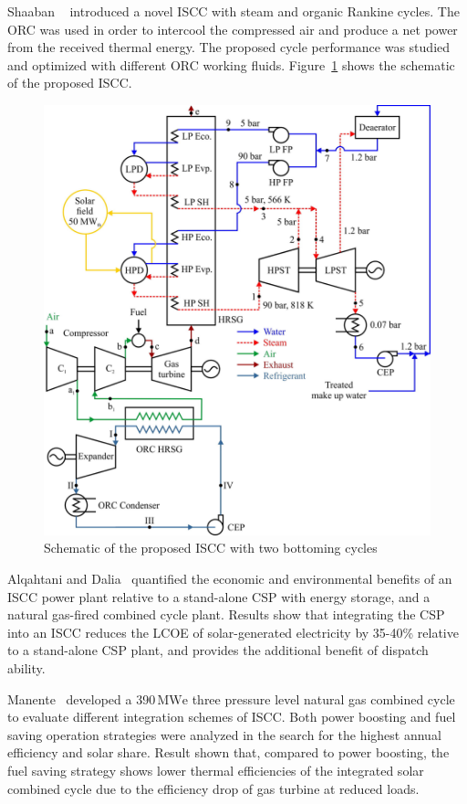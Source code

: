 Shaaban ~\cite{Shaaban2016} introduced a novel ISCC with steam and organic Rankine cycles. The ORC was used in order to intercool the compressed air and produce a net power from the received thermal energy. The proposed cycle performance was studied and optimized with different ORC working fluids. Figure~\ref{fig:Shaaban2016} shows the schematic of the proposed ISCC.
\begin{figure}[!ht]
\centering
\includegraphics[width=.8\textwidth]{fig/Shaaban2016.jpg}
\caption{Schematic of the proposed ISCC with two bottoming cycles}\label{fig:Shaaban2016}
\end{figure}

Alqahtani and Dalia~\cite{Alqahtani2016} quantified the economic and environmental benefits of an ISCC power plant relative to a stand-alone CSP with energy storage, and a natural gas-fired combined cycle plant. Results show that integrating the CSP into an ISCC reduces the LCOE of solar-generated electricity by 35-40\% relative to a stand-alone CSP plant, and provides the additional benefit of dispatch ability.

Manente~\cite{Manente2016} developed a 390$\,\mathrm{MWe}$ three pressure level natural gas combined cycle to evaluate different integration schemes of ISCC. Both power boosting and fuel saving operation strategies were analyzed in the search for the highest annual efficiency and solar share. Result shown that, compared to power boosting, the fuel saving strategy shows lower thermal efficiencies of the integrated solar combined cycle due to the efficiency drop of gas turbine at reduced loads.

